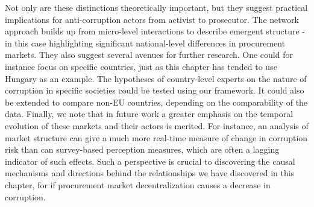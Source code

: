 Not only are these distinctions theoretically important, but they suggest practical implications for anti-corruption actors from activist to prosecutor. The network approach builds up from micro-level interactions to describe emergent structure - in this case highlighting significant national-level differences in procurement markets. They also suggest several avenues for further research. One could for instance focus on specific countries, just as this chapter has tended to use Hungary as an example. The hypotheses of country-level experts on the nature of corruption in specific societies could be tested using our framework. It could also be extended to compare non-EU countries, depending on the comparability of the data. Finally, we note that in future work a greater emphasis on the temporal evolution of these markets and their actors is merited. For instance, an analysis of market structure can give a much more real-time measure of change in corruption risk than can survey-based perception measures, which are often a lagging indicator of such effects. Such a perspective is crucial to discovering the causal mechanisms and directions behind the relationships we have discovered in this chapter, for if procurement market decentralization causes a decrease in corruption.

